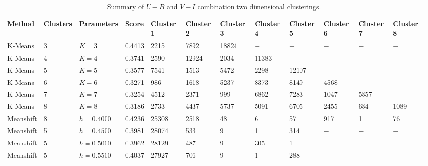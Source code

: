 \begin{table*}
\centering
\caption{Summary of $U - B$ and $V - I$ combination two dimensional clusterings.}
\label{tab:BBclustering}
\begin{tabular}{llllllllllll}
\hline\hline
Method & Clusters & Parameters & Score & Cluster 1 & Cluster 2  & Cluster 3 & Cluster 4 & Cluster 5 & Cluster 6 & Cluster 7 & Cluster 8\\
\hline
K-Means & 3 & $K = 3$ & 0.4413 & 2215 & 7892 & 18824 & $ - $ & $ - $ & $ - $ & $ - $ & $ - $ \\
K-Means & 4 & $K = 4$ & 0.3741 & 2590 & 12924 & 2034 & 11383 & $ - $ & $ - $ & $ - $ & $ - $ \\
K-Means & 5 & $K = 5$ & 0.3577 & 7541 & 1513 & 5472 & 2298 & 12107 & $ - $ & $ - $ & $ - $ \\
K-Means & 6 & $K = 6$ & 0.3271 & 986 & 1618 & 5237 & 8373 & 8149 & 4568 & $ - $ & $ - $ \\
K-Means & 7 & $K = 7$ & 0.3254 & 4512 & 2371 & 999 & 6862 & 7283 & 1047 & 5857 & $ - $ \\
K-Means & 8 & $K = 8$ & 0.3186 & 2733 & 4437 & 5737 & 5091 & 6705 & 2455 & 684 & 1089 \\
Meanshift & 8 & $h = 0.4000 $ & 0.4236 & 25308 & 2518 & 48 & 6 & 57 & 917 & 1 & 76 \\
Meanshift & 5 & $h = 0.4500 $ & 0.3981 & 28074 & 533 & 9 & 1 & 314 & $ - $ & $ - $ & $ - $ \\
Meanshift & 5 & $h = 0.5000 $ & 0.3962 & 28129 & 487 & 9 & 305 & 1 & $ - $ & $ - $ & $ - $ \\
Meanshift & 5 & $h = 0.5500 $ & 0.4037 & 27927 & 706 & 9 & 1 & 288 & $ - $ & $ - $ & $ - $ \\
\hline
\end{tabular}
\end{table*}
